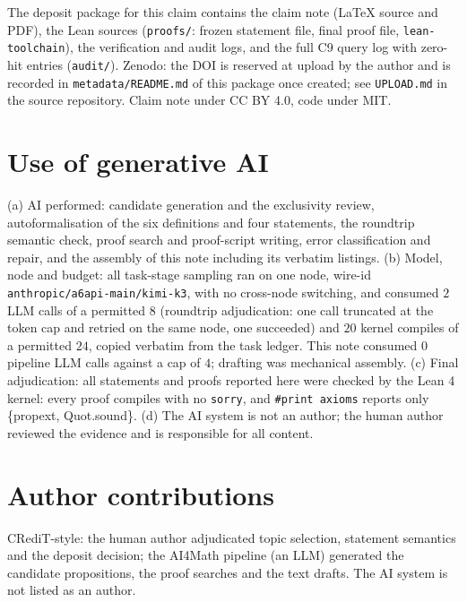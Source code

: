\documentclass[11pt]{article}
\theoremstyle{definition}
\begin{document}
The deposit package for this claim contains the claim note (LaTeX source and
PDF), the Lean sources (\texttt{proofs/}: frozen statement file, final proof
file, \texttt{lean-toolchain}), the verification and audit logs, and the full
C9 query log with zero-hit entries (\texttt{audit/}). Zenodo: the DOI is
reserved at upload by the author and is recorded in \texttt{metadata/README.md}
of this package once created; see \texttt{UPLOAD.md} in the source repository.
Claim note under CC BY 4.0, code under MIT.

\section*{Use of generative AI}

(a) AI performed: candidate generation and the exclusivity review,
autoformalisation of the six definitions and four statements, the roundtrip
semantic check, proof search and proof-script writing, error classification and
repair, and the assembly of this note including its verbatim listings. (b)
Model, node and budget: all task-stage sampling ran on one node, wire-id
\texttt{anthropic/a6api-main/kimi-k3}, with no cross-node switching, and
consumed $2$ LLM calls of a permitted $8$ (roundtrip adjudication: one call
truncated at the token cap and retried on the same node, one succeeded) and
$20$ kernel compiles of a permitted $24$, copied verbatim from the task ledger.
This note consumed $0$ pipeline LLM calls against a cap of $4$; drafting was
mechanical assembly. (c) Final adjudication: all statements and proofs reported
here were checked by the Lean 4 kernel: every proof compiles with no
\texttt{sorry}, and \texttt{\#print axioms} reports only \{propext,
Quot.sound\}. (d) The AI system is not an author; the human author reviewed the
evidence and is responsible for all content.

\section*{Author contributions}

CRediT-style: the human author adjudicated topic selection, statement semantics
and the deposit decision; the AI4Math pipeline (an LLM) generated the candidate
propositions, the proof searches and the text drafts. The AI system is not
listed as an author.
\end{document}

